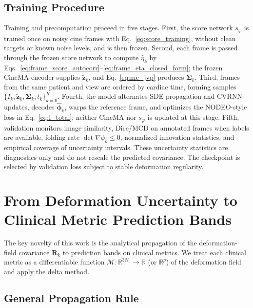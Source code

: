 \documentclass[10pt,twocolumn]{article}
\newcommand{\R}{\mathbb{R}}
\begin{document}
\subsection{Training Procedure}
\label{sec:training_procedure}

Training and precomputation proceed in five stages. First, the score network $s_{\varphi}$ is trained once on noisy cine frames with Eq.~\eqref{eq:score_training}, without clean targets or known noise levels, and is then frozen. Second, each frame is passed through the frozen score network to compute $\hat{\eta}_k$ by Eqs.~\eqref{eq:frame_score_autocorr}--\eqref{eq:frame_eta_closed_form}; the frozen CineMA encoder supplies $\tilde{\bm{z}}_k$, and Eq.~\eqref{eq:mc_jvp} produces $\bm{\Sigma}_k$. Third, frames from the same patient and view are ordered by cardiac time, forming samples $\{I_k,\tilde{\bm{z}}_k,\bm{\Sigma}_k,t_k\}_{k=0}^{K}$. Fourth, the model alternates SDE propagation and CVRNN updates, decodes $\widehat{\bm{\phi}}_k$, warps the reference frame, and optimizes the NODEO-style loss in Eq.~\eqref{eq:l_total}; neither CineMA nor $s_{\varphi}$ is updated at this stage. Fifth, validation monitors image similarity, Dice/MCD on annotated frames when labels are available, folding rate $\det\nabla\phi_k\leq0$, normalized innovation statistics, and empirical coverage of uncertainty intervals. These uncertainty statistics are diagnostics only and do not rescale the predicted covariance. The checkpoint is selected by validation loss subject to stable deformation regularity.

\section{From Deformation Uncertainty to Clinical Metric Prediction Bands}
\label{sec:clinical}

The key novelty of this work is the analytical propagation of the deformation-field covariance $\bm{R}_k$ to prediction bands on clinical metrics. We treat each clinical metric as a differentiable function $\mathcal{M}: \R^{3N_v} \to \R$ (or $\R^p$) of the deformation field and apply the delta method.

\subsection{General Propagation Rule}
\end{document}

